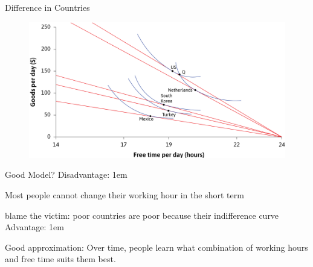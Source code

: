 \documentclass[11pt,aspectratio=43,usenames,dvipsnames]{beamer}
\let\oldenumerate=\enumerate
\let\endoldenumerate=\endenumerate
\renewenvironment{enumerate}{\oldenumerate \itemsep1em}{ \endoldenumerate}
\theoremstyle{definition}
\begin{document}
\begin{frame}{Difference in Countries}
\label{slide:Difference_in_Countries}
\begin{figure}
    \centering
    \includegraphics[width=\textwidth]{./figures/WorkCountryDiff.png}
\end{figure}


\end{frame}

\begin{frame}{Good Model?}
\label{slide:Good_Model_}
    Disadvantage:
    \begin{enumerate}
        \item Most people cannot change their working hour in the short term
        \item blame the victim: poor countries are poor because their indifference curve
    \end{enumerate}
    Advantage:
    \begin{enumerate}
        \item Good approximation: Over time, people learn what combination of working hours and free time suits them best.
    \end{enumerate}



\end{frame}
\end{document}
